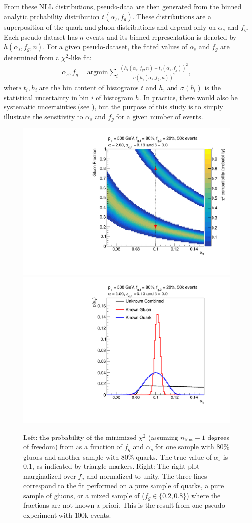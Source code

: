 From these NLL distributions, pseudo-data are then generated from the binned analytic probability distribution $t(\alpha_s,f_g)$.
%
These distributions are a superposition of the quark and gluon distributions and depend only on $\alpha_s$ and $f_g$.
%
Each pseudo-dataset has $n$ events and its binned representation is denoted by $h(\alpha_s,f_g,n)$.
%
For a given pseudo-dataset, the fitted values of $\alpha_s$ and $f_g$ are determined from a $\chi^2$-like fit:
%
\begin{align}
\label{eq:chi2fit}
\alpha_s,f_g=\text{argmin} \sum_i \frac{\left(h_i(\alpha_s,f_g,n)-t_i(\alpha_s,f_g)\right)^2}{\sigma(h_i(\alpha_s,f_g,n))^2},
\end{align}
%
where $t_i, h_i$ are the bin content of histograms $t$ and $h$, and $\sigma(h_i)$ is the statistical uncertainty in bin $i$ of histogram $h$.
%
In practice, there would also be systematic uncertainties (see ), but the purpose of this study is to simply illustrate the sensitivity to $\alpha_s$ and $f_g$ for a given number of events.


	
\begin{figure}[t]
\begin{center}
\includegraphics[width = 0.49\columnwidth]{figures/banana_alpha_20beta_0_zcut_123451324.pdf}
\includegraphics[width = 0.49\columnwidth]{figures/palpha_alpha_20beta_0_zcut_123451324.pdf}
\end{center}
\caption{Left: the probability of the minimized $\chi^2$ (assuming $n_\text{bins}-1$ degrees of freedom) from  as a
  function of $f_g$ and $\alpha_s$ for one sample with 80\% gluons and another sample with 80\% quarks.  The true value of $\alpha_s$ is 0.1, as indicated by triangle markers.  Right: The right plot marginalized over $f_g$ and normalized to unity.  The three lines correspond to the fit performed on a pure sample of quarks, a pure sample of gluons, or a mixed sample of ($f_g\in\{0.2,0.8\}$) where the fractions are not known a priori.  This is the result from one pseudo-experiment with 100k events.}
\label{fig:alpha2fit}
\end{figure}



